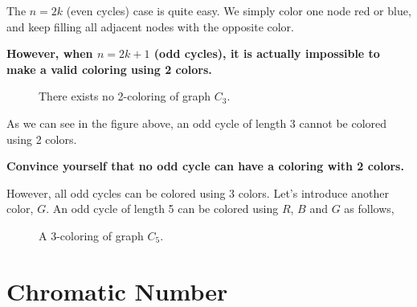 \documentclass[12pt]{exam}
\begin{document}
The $n=2k$ (even cycles) case is quite easy. We simply color one node red or blue, and keep filling all adjacent nodes with the opposite color.

\textbf{However, when $n = 2k+1$ (odd cycles), it is actually impossible to make a valid coloring using 2 colors.}

\begin{figure}[h]

    \centering
    

    \caption{There exists no 2-coloring of graph $C_3$.}
    
\end{figure}

As we can see in the figure above, an odd cycle of length 3 cannot be colored using 2 colors.

\textbf{Convince yourself that no odd cycle can have a coloring with 2 colors.}

However, all odd cycles can be colored using 3 colors. Let's introduce another color, $G$. An odd cycle of length 5 can be colored using $R$, $B$ and $G$ as follows, 

\newpage 

\begin{figure}[h]

    \centering
    

    \caption{A 3-coloring of graph $C_5$.}
    
\end{figure}

\section{Chromatic Number}
\end{document}
